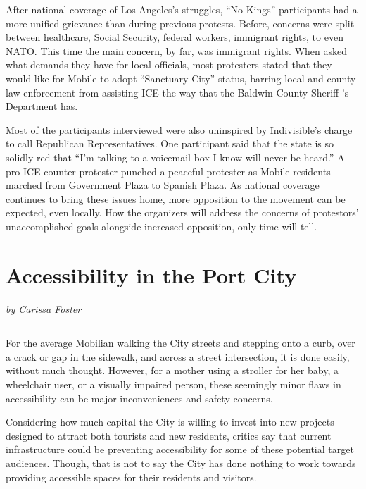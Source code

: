 \documentclass[
]{book}
\begin{document}
After national coverage of Los Angeles's struggles, ``No Kings'' participants had a more unified grievance than during previous protests. Before, concerns were split between healthcare, Social Security, federal workers, immigrant rights, to even NATO. This time the main concern, by far, was immigrant rights. When asked what demands they have for local officials, most protesters stated that they would like for Mobile to adopt ``Sanctuary City'' status, barring local and county law enforcement from assisting ICE the way that the Baldwin County Sheriff 's Department has.

Most of the participants interviewed were also uninspired by Indivisible's charge to call Republican Representatives. One participant said that the state is so solidly red that ``I'm talking to a voicemail box I know will never be heard.'' A pro-ICE counter-protester punched a peaceful protester as Mobile residents marched from Government Plaza to Spanish Plaza. As national coverage continues to bring these issues home, more opposition to the movement can be expected, even locally. How the organizers will address the concerns of protestors' unaccomplished goals alongside increased opposition, only time will tell.

\section*{Accessibility in the Port City}\label{accessibility-in-the-port-city}

\emph{by Carissa Foster}

\begin{center}\rule{0.5\linewidth}{0.5pt}\end{center}

For the average Mobilian walking the City streets and stepping onto a curb, over a crack or gap in the sidewalk, and across a street intersection, it is done easily, without much thought. However, for a mother using a stroller for her baby, a wheelchair user, or a visually impaired person, these seemingly minor flaws in accessibility can be major inconveniences and safety concerns.

Considering how much capital the City is willing to invest into new projects designed to attract both tourists and new residents, critics say that current infrastructure could be preventing accessibility for some of these potential target audiences. Though, that is not to say the City has done nothing to work towards providing accessible spaces for their residents and visitors.
\end{document}
